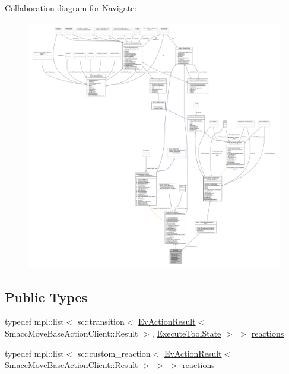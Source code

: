 Collaboration diagram for Navigate\+:
\nopagebreak
\begin{figure}[H]
\begin{center}
\leavevmode
\includegraphics[width=350pt]{structNavigate__coll__graph}
\end{center}
\end{figure}
\subsection*{Public Types}
\begin{DoxyCompactItemize}
\item 
typedef mpl\+::list$<$ sc\+::transition$<$ \hyperlink{structsmacc_1_1EvActionResult}{Ev\+Action\+Result}$<$ Smacc\+Move\+Base\+Action\+Client\+::\+Result $>$, \hyperlink{structExecuteToolState}{Execute\+Tool\+State} $>$ $>$ \hyperlink{structNavigate_afdad91862c4900a993cc6e44309e807a}{reactions}
\item 
typedef mpl\+::list$<$ sc\+::custom\+\_\+reaction$<$ \hyperlink{structsmacc_1_1EvActionResult}{Ev\+Action\+Result}$<$ Smacc\+Move\+Base\+Action\+Client\+::\+Result $>$ $>$ $>$ \hyperlink{structNavigate_a7948e7393b5358874dede3754b993e73}{reactions}
\end{DoxyCompactItemize}
